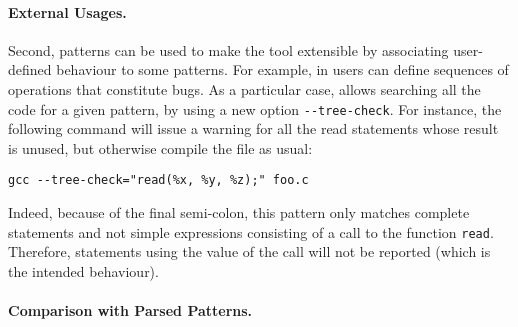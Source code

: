 \paragraph{External Usages.}

Second, patterns can be used to make the tool extensible by
associating user\hyp{}defined behaviour to some patterns. For example,
in \MyGCC users can define sequences of operations that constitute
bugs. As a particular case, \MyGCC allows searching all the code for a
given pattern, by using a new option \verb|--tree-check|. For
instance, the following command will issue a warning for all the read
statements whose result is unused, but otherwise compile the file as
usual:
\begin{verbatim}
gcc --tree-check="read(%x, %y, %z);" foo.c   
\end{verbatim}
Indeed, because of the final semi\hyp{}colon, this pattern only
matches complete statements and not simple expressions consisting of a
call to the function \texttt{read}. Therefore, statements using the
value of the call will not be reported (which is the intended
behaviour).

\paragraph{Comparison with Parsed Patterns.}

